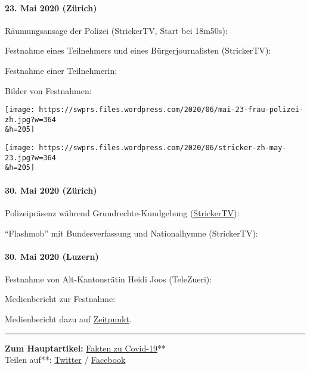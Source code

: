 \hypertarget{23-mai-2020-zuxfcrich}{%
\paragraph{23. Mai 2020 (Zürich)}\label{23-mai-2020-zuxfcrich}}

Räumungsansage der Polizei (StrickerTV, Start bei 18m50s):

Festnahme eines Teilnehmers und eines Bürgerjournalisten (StrickerTV):

Festnahme einer Teilnehmerin:

Bilder von Festnahmen:

\texttt{[image: https://swprs.files.wordpress.com/2020/06/mai-23-frau-polizei-zh.jpg?w=364\\\&h=205]}

\texttt{[image: https://swprs.files.wordpress.com/2020/06/stricker-zh-may-23.jpg?w=364\\\&h=205]}

\hypertarget{30-mai-2020-zuxfcrich}{%
\paragraph{30. Mai 2020 (Zürich)}\label{30-mai-2020-zuxfcrich}}

Polizeipräsenz während Grundrechte-Kundgebung
(\href{https://www.youtube.com/watch?v=xKLz6KM9OTQ}{StrickerTV}):

``Flashmob'' mit Bundesverfassung und Nationalhymne (StrickerTV):

\hypertarget{30-mai-2020-luzern}{%
\paragraph{30. Mai 2020 (Luzern)}\label{30-mai-2020-luzern}}

Festnahme von Alt-Kantonsrätin Heidi Joos (TeleZueri):

Medienbericht zur Festnahme:

Medienbericht dazu auf
\href{https://www.zeitpunkt.ch/luzerner-polizei-verhaftet-ehemalige-luzerner-kantonsparlamentarierin-unter-gewaltanwendung}{Zeitpunkt}.

\begin{center}\rule{0.5\linewidth}{\linethickness}\end{center}

\textbf{\textbf{Zum Hauptartikel}:}
\href{https://swprs.org/covid-19-hinweis-ii/}{Fakten zu Covid-19}**\\
Teilen auf**:
\href{https://twitter.com/intent/tweet?url=https://swprs.org/corona-repression-in-der-schweiz/}{Twitter}
/
\href{https://www.facebook.com/share.php?u=https://swprs.org/corona-repression-in-der-schweiz/}{Facebook}

